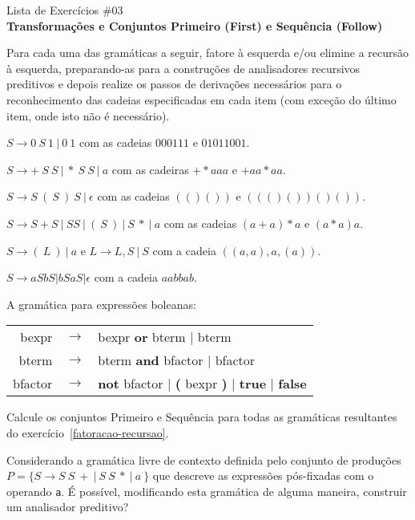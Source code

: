 \documentclass{compiladores}
\begin{document}
\begin{center}
{\LARGE Lista de Exercícios \#03}\\
{\bf Transformações e Conjuntos Primeiro (First) e Sequência (Follow)}
\end{center}

\begin{listanumerada}
\item
\label{fatoracao-recursao}
Para cada uma das gramáticas a seguir, fatore à esquerda e/ou elimine
a recursão à esquerda, preparando-as para a construções de
analisadores recursivos preditivos e depois realize os passos de
derivações necessários para o reconhecimento das cadeias especificadas
em cada item (com exceção do último item, onde isto não é necessário).
\begin{lista}
\item $S \rightarrow 0\ S\ 1\ |\ 0\ 1$ com as cadeias $000111$ e $01011001$. 
\item $S \rightarrow +\ S\ S\ |\ *\ S\ S\ |\ a$ com as cadeiras $+*aaa$ e $+aa*aa$.
\item $S \rightarrow S\ (\ S\ )\ S\ |\ {\epsilon}$ com as cadeias $(()())$ e $((()())()())$.
\item $S \rightarrow S + S\ |\ SS\ |\ (\ S\ )\ |\ S\ *\ |\ a$ com as cadeias $(a+a)*a$ e $(a*a)a$.
\item $S \rightarrow (\ L\ )\ |\ a$ e $L \rightarrow L, S\ |\ S$ com a cadeia $((a,a),a,(a))$.
\item $S \rightarrow aSbS | bSaS | {\epsilon}$ com a cadeia $aabbab$.
\item A gramática para expressões boleanas: \\
  \begin{tabular}{rcl}
    bexpr & $\rightarrow$ & bexpr {\bf or} bterm | bterm \\
    bterm & $\rightarrow$ & bterm {\bf and} bfactor | bfactor \\
    bfactor & $\rightarrow$ & {\bf not} bfactor | {\bf (} bexpr {\bf )} | {\bf true} | {\bf false}
  \end{tabular}
\end{lista}

\item
Calcule os conjuntos Primeiro e Sequência para todas as gramáticas resultantes do exercício~\ref{fatoracao-recursao}.

\item
\label{expressoesposfixadas}
Considerando a gramática livre de contexto definida pelo conjunto de
produções $P = \{ S \rightarrow S\ S\ +\ |\ S\ S\ *\ |\ a\ \}$ que
descreve as expressões pós-fixadas com o operando \texttt{a}. É
possível, modificando esta gramática de alguma maneira, construir um
analisador preditivo?


\end{listanumerada}
\end{document}
